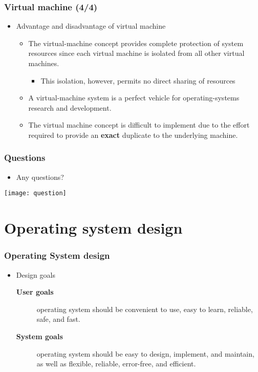 \documentclass[CJKutf8,dvipsnames,table]{beamer}
\begin{document}
\begin{CJK*}{UTF8}{song}
  \begin{frame}
    \frametitle{Virtual machine (4/4)} \pause
    \begin{itemize}
    \item Advantage and disadvantage of virtual machine  \pause
      \begin{itemize}
      \item The virtual-machine concept provides complete protection of system resources since each virtual machine is isolated from all other virtual machines.  \pause
        \begin{itemize}
        \item This isolation, however, permits no direct sharing of resources  \pause
        \end{itemize}
      \item A virtual-machine system is a perfect vehicle for operating-systems research and development.  \pause
      \item The virtual machine concept is difficult to implement due to the effort required to provide an \textbf{exact} duplicate to the underlying machine. 
      \end{itemize}
    \end{itemize}
  \end{frame}
  
  \begin{frame}
    \frametitle{Questions}
    \begin{itemize}
    \item Any questions? 
    \end{itemize}
    \begin{center}
      \texttt{[image: question]}
    \end{center}
  \end{frame}

  \section{Operating system design}
  
  \begin{frame}
    \frametitle{Operating System design} \pause
    \begin{itemize}
    \item Design goals  \pause
      \begin{description}
      \item[\textbf{User goals}]{operating system should be convenient to use, easy to learn, reliable, safe, and fast.} \pause
      \item[\textbf{System goals}]{operating system should be easy to design, implement, and maintain, as well as flexible, reliable, error-free, and efficient.}
      \end{description}
    \end{itemize}
  \end{frame}
  

\end{CJK*}
\end{document}
